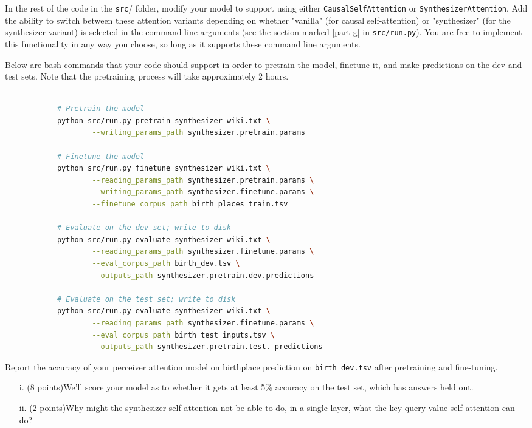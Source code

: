 \documentclass[letterpaper,12pt]{article}
\begin{document}
\begin{itemize}
		In the rest of the code in the \texttt{src}/ folder, modify your model to support using either \texttt{CausalSelfAttention} or \texttt{SynthesizerAttention}. Add the ability to switch between these attention variants depending on whether "vanilla" (for causal self-attention) or "synthesizer" (for the synthesizer variant) is selected in the command line arguments (see the section marked [part g] in \texttt{src/run.py}). You are free to implement this functionality in any way you choose, so long as it supports these command line arguments.
		
		Below are bash commands that your code should support in order to pretrain the model, finetune it, and make predictions on the dev and test sets.
		Note that the pretraining process will take approximately 2 hours. 
		\begin{lstlisting}[basicstyle=\ttfamily, language=bash]
			
			# Pretrain the model
			python src/run.py pretrain synthesizer wiki.txt \
					--writing_params_path synthesizer.pretrain.params
			
			# Finetune the model
			python src/run.py finetune synthesizer wiki.txt \
					--reading_params_path synthesizer.pretrain.params \
					--writing_params_path synthesizer.finetune.params \
					--finetune_corpus_path birth_places_train.tsv
			
			# Evaluate on the dev set; write to disk
			python src/run.py evaluate synthesizer wiki.txt \
					--reading_params_path synthesizer.finetune.params \
					--eval_corpus_path birth_dev.tsv \
					--outputs_path synthesizer.pretrain.dev.predictions
			
			# Evaluate on the test set; write to disk
			python src/run.py evaluate synthesizer wiki.txt \
					--reading_params_path synthesizer.finetune.params \
					--eval_corpus_path birth_test_inputs.tsv \
					--outputs_path synthesizer.pretrain.test. predictions
		\end{lstlisting}
		
		Report the accuracy of your perceiver attention model on birthplace prediction on \texttt{birth\_dev.tsv} after pretraining and fine-tuning.
		\begin{itemize}
		\item[i.]
			(8 points)We'll score your model as to whether it gets at least 5\% accuracy on the test set, which has answers held out.
			
		\item[ii.]
			(2 points)Why might the synthesizer self-attention not be able to do, in a single layer, what the key-query-value self-attention can do?
		\end{itemize}
		
	\end{itemize}
	
\end{document}
